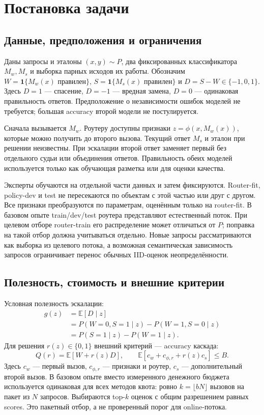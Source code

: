 \section{Постановка задачи}
\subsection{Данные, предположения и ограничения}
Даны запросы и эталоны $(x,y)\sim P$, два фиксированных классификатора
$M_w,M_s$ и выборка парных исходов их работы.
Обозначим $W=\mathbf1\{M_w(x)\text{ правилен}\}$,
$S=\mathbf1\{M_s(x)\text{ правилен}\}$ и $D=S-W\in\{-1,0,1\}$.
Здесь $D=1$ --- спасение, $D=-1$ --- вредная замена,
$D=0$ --- одинаковая правильность ответов. Предположение о независимости
ошибок моделей не требуется; большая accuracy второй модели не постулируется.

Сначала вызывается $M_w$. Роутеру доступны признаки
$z=\phi(x,M_w(x))$, которые можно получить до второго вызова.
Текущий ответ $M_s$ и эталон при решении неизвестны. При эскалации
второй ответ заменяет первый без отдельного судьи или объединения ответов.
Правильность обеих моделей используется только как обучающая разметка
или для оценки качества.

Эксперты обучаются на отдельной части данных и затем фиксируются.
Router-fit, policy-dev и test не пересекаются по объектам с этой частью
или друг с другом. Все признаки преобразуются по параметрам, оценённым
только на router-fit. В базовом опыте train/dev/test роутера представляют
естественный поток. При целевом отборе router-train его распределение
может отличаться от $P$; поправка на такой отбор должна учитываться
отдельно. Новые запросы рассматриваются как выборка из целевого потока,
а возможная семантическая зависимость запросов ограничивает перенос
обычных IID-оценок неопределённости.

\subsection{Полезность, стоимость и внешние критерии}
Условная полезность эскалации:
\begin{equation}\label{eq:gain}
\begin{aligned}
g(z)&=\mathbb E[D\mid z]\\
&=P(W=0,S=1\mid z)-P(W=1,S=0\mid z)\\
&=P(S=1\mid z)-P(W=1\mid z).
\end{aligned}
\end{equation}
Для решения $r(z)\in\{0,1\}$ внешний критерий --- accuracy каскада:
\begin{equation}\label{eq:quality}
 Q(r)=\mathbb E[W+r(z)D],\qquad
 \mathbb E[c_w+c_{\phi,r}+r(z)c_s]\le B.
\end{equation}
Здесь $c_w$ --- первый вызов, $c_{\phi,r}$ --- признаки и роутер,
$c_s$ --- дополнительный второй вызов. В базовом опыте вместо
измеренного денежного бюджета используется одинаковая для всех методов
квота: ровно $k=\lfloor bN\rfloor$ вызовов на пакет из $N$ запросов.
Выбираются top-$k$ оценок с общим разрешением равных scores.
Это пакетный отбор, а не проверенный порог для online-потока.

